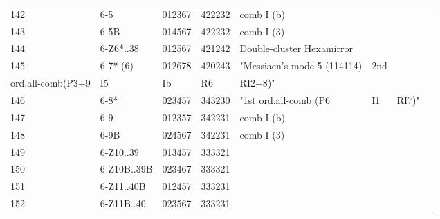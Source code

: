 \begin{table}[h]
\begin{tabular}{lllll}
142                    & 6-5                 & 012367  & 422232    & comb I (b)                                                 &                             &                   &      &     \\
143                    & 6-5B                & 014567  & 422232    & comb I (3)                                                 &                             &                   &      &     \\
144                    & 6-Z6*..38           & 012567  & 421242    & Double-cluster Hexamirror                                  &                             &                   &      &     \\
145                    & 6-7* (6)            & 012678  & 420243    & "Messiaen's mode 5 (114114)                                & 2nd                         &                   &      &     \\
ord.all-comb(P3+9      & I5                  & Ib      & R6        & RI2+8)"                                                    &                             &                   &      &     \\
146                    & 6-8*                & 023457  & 343230    & "1st ord.all-comb (P6                                      & I1                          & RI7)"             &      &     \\
147                    & 6-9                 & 012357  & 342231    & comb I (b)                                                 &                             &                   &      &     \\
148                    & 6-9B                & 024567  & 342231    & comb I (3)                                                 &                             &                   &      &     \\
149                    & 6-Z10..39           & 013457  & 333321    &                                                            &                             &                   &      &     \\
150                    & 6-Z10B..39B         & 023467  & 333321    &                                                            &                             &                   &      &     \\
151                    & 6-Z11..40B          & 012457  & 333231    &                                                            &                             &                   &      &     \\
152                    & 6-Z11B..40          & 023567  & 333231    &                                                            &                             &                   &      &     \\

\end{tabular}
\end{table}
